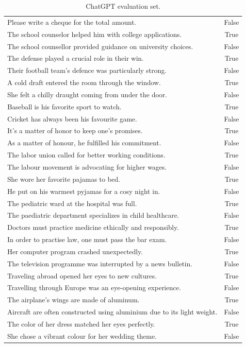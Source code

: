 \documentclass{article}
\begin{document}
\begin{table}[t]
\begin{small}
{\begin{tabular}{|l|c|}
Please write a cheque for the total amount. & False \\
The school counselor helped him with college applications. & True \\
The school counsellor provided guidance on university choices. & False \\
The defense played a crucial role in their win. & True \\
Their football team's defence was particularly strong. & False \\
A cold draft entered the room through the window. & True \\
She felt a chilly draught coming from under the door. & False \\
Baseball is his favorite sport to watch. & True \\
Cricket has always been his favourite game. & False \\
It's a matter of honor to keep one's promises. & True \\
As a matter of honour, he fulfilled his commitment. & False \\
The labor union called for better working conditions. & True \\
The labour movement is advocating for higher wages. & False \\
She wore her favorite pajamas to bed. & True \\
He put on his warmest pyjamas for a cosy night in. & False \\
The pediatric ward at the hospital was full. & True \\
The paediatric department specializes in child healthcare. & False \\
Doctors must practice medicine ethically and responsibly. & True \\
In order to practise law, one must pass the bar exam. & False \\
Her computer program crashed unexpectedly. & True \\
The television programme was interrupted by a news bulletin. & False \\
Traveling abroad opened her eyes to new cultures. & True \\
Travelling through Europe was an eye-opening experience. & False \\
The airplane's wings are made of aluminum. & True \\
Aircraft are often constructed using aluminium due to its light weight. & False \\
The color of her dress matched her eyes perfectly. & True \\
She chose a vibrant colour for her wedding theme. & False \\
\hline
\end{tabular}
}
\end{small}
\caption{ChatGPT evaluation set.}
\label{table:sentences2}
\end{table}
\end{document}
